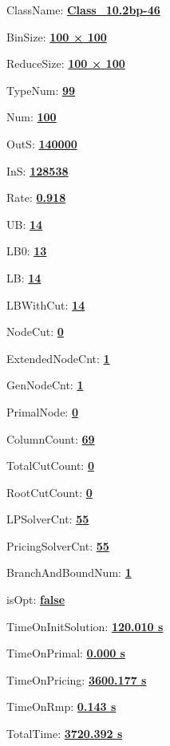 \documentclass[11pt]{article}
\begin{document}
\pagestyle{empty}


ClassName: \underline{\textbf{Class_10.2bp-46}}
\par
BinSize: \underline{\textbf{100 × 100}}
\par
ReduceSize: \underline{\textbf{100 × 100}}
\par
TypeNum: \underline{\textbf{99}}
\par
Num: \underline{\textbf{100}}
\par
OutS: \underline{\textbf{140000}}
\par
InS: \underline{\textbf{128538}}
\par
Rate: \underline{\textbf{0.918}}
\par
UB: \underline{\textbf{14}}
\par
LB0: \underline{\textbf{13}}
\par
LB: \underline{\textbf{14}}
\par
LBWithCut: \underline{\textbf{14}}
\par
NodeCut: \underline{\textbf{0}}
\par
ExtendedNodeCnt: \underline{\textbf{1}}
\par
GenNodeCnt: \underline{\textbf{1}}
\par
PrimalNode: \underline{\textbf{0}}
\par
ColumnCount: \underline{\textbf{69}}
\par
TotalCutCount: \underline{\textbf{0}}
\par
RootCutCount: \underline{\textbf{0}}
\par
LPSolverCnt: \underline{\textbf{55}}
\par
PricingSolverCnt: \underline{\textbf{55}}
\par
BranchAndBoundNum: \underline{\textbf{1}}
\par
isOpt: \underline{\textbf{false}}
\par
TimeOnInitSolution: \underline{\textbf{120.010 s}}
\par
TimeOnPrimal: \underline{\textbf{0.000 s}}
\par
TimeOnPricing: \underline{\textbf{3600.177 s}}
\par
TimeOnRmp: \underline{\textbf{0.143 s}}
\par
TotalTime: \underline{\textbf{3720.392 s}}
\par
\newpage


\end{document}
